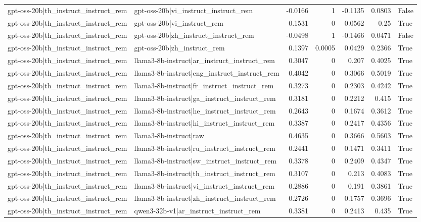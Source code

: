 \begin{table}
\begin{tabular}{l l r r r r l}
gpt-oss-20b|th_instruct_instruct_rem & gpt-oss-20b|vi_instruct_instruct_rem & -0.0166 & 1 & -0.1135 & 0.0803 & False \\
gpt-oss-20b|th_instruct_instruct_rem & gpt-oss-20b|vi_instruct_rem & 0.1531 & 0 & 0.0562 & 0.25 & True \\
gpt-oss-20b|th_instruct_instruct_rem & gpt-oss-20b|zh_instruct_instruct_rem & -0.0498 & 1 & -0.1466 & 0.0471 & False \\
gpt-oss-20b|th_instruct_instruct_rem & gpt-oss-20b|zh_instruct_rem & 0.1397 & 0.0005 & 0.0429 & 0.2366 & True \\
gpt-oss-20b|th_instruct_instruct_rem & llama3-8b-instruct|ar_instruct_instruct_rem & 0.3047 & 0 & 0.207 & 0.4025 & True \\
gpt-oss-20b|th_instruct_instruct_rem & llama3-8b-instruct|eng_instruct_instruct_rem & 0.4042 & 0 & 0.3066 & 0.5019 & True \\
gpt-oss-20b|th_instruct_instruct_rem & llama3-8b-instruct|fr_instruct_instruct_rem & 0.3273 & 0 & 0.2303 & 0.4242 & True \\
gpt-oss-20b|th_instruct_instruct_rem & llama3-8b-instruct|ga_instruct_instruct_rem & 0.3181 & 0 & 0.2212 & 0.415 & True \\
gpt-oss-20b|th_instruct_instruct_rem & llama3-8b-instruct|he_instruct_instruct_rem & 0.2643 & 0 & 0.1674 & 0.3612 & True \\
gpt-oss-20b|th_instruct_instruct_rem & llama3-8b-instruct|hi_instruct_instruct_rem & 0.3387 & 0 & 0.2417 & 0.4356 & True \\
gpt-oss-20b|th_instruct_instruct_rem & llama3-8b-instruct|raw & 0.4635 & 0 & 0.3666 & 0.5603 & True \\
gpt-oss-20b|th_instruct_instruct_rem & llama3-8b-instruct|ru_instruct_instruct_rem & 0.2441 & 0 & 0.1471 & 0.3411 & True \\
gpt-oss-20b|th_instruct_instruct_rem & llama3-8b-instruct|sw_instruct_instruct_rem & 0.3378 & 0 & 0.2409 & 0.4347 & True \\
gpt-oss-20b|th_instruct_instruct_rem & llama3-8b-instruct|th_instruct_instruct_rem & 0.3107 & 0 & 0.213 & 0.4083 & True \\
gpt-oss-20b|th_instruct_instruct_rem & llama3-8b-instruct|vi_instruct_instruct_rem & 0.2886 & 0 & 0.191 & 0.3861 & True \\
gpt-oss-20b|th_instruct_instruct_rem & llama3-8b-instruct|zh_instruct_instruct_rem & 0.2726 & 0 & 0.1757 & 0.3696 & True \\
gpt-oss-20b|th_instruct_instruct_rem & qwen3-32b-v1|ar_instruct_instruct_rem & 0.3381 & 0 & 0.2413 & 0.435 & True \\

\end{tabular}
\end{table}
